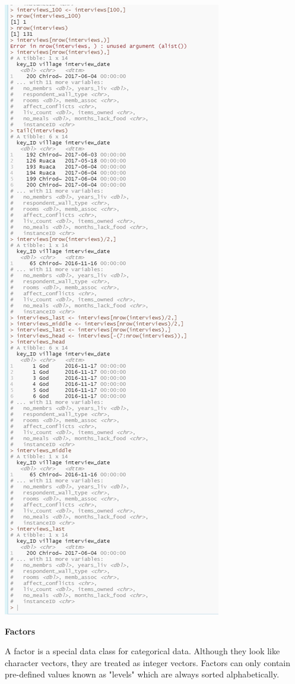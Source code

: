 \documentclass[12pt]{article}
\begin{document}
\centering\includegraphics[scale=1]{imgdcrtibbles.PNG}

\flushleft\textbf{Factors}

A factor is a special data class for categorical data. Although they look like character vectors, they are treated as integer vectors. Factors can only contain pre-defined values known as "levels" which are always sorted alphabetically.
\end{document}

